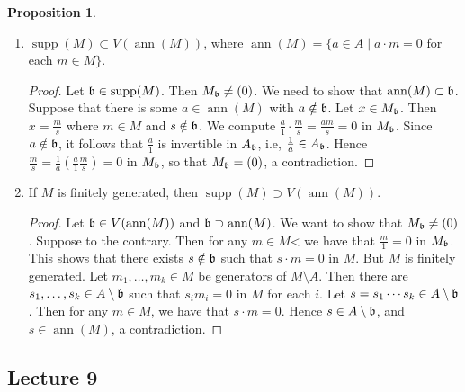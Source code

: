 \documentclass[10pt,letterpaper,cm]{nupset}
\theoremstyle{definition}
\theoremstyle{theorem}
\newtheorem{prop}[definition]{Proposition}
\theoremstyle{remark}
\newcommand{\1}{\mathbf{1}}
\newcommand{\0}{\vec 0}
\DeclareMathOperator{\ann}{ann}
\DeclareMathOperator{\supp}{supp}
\begin{document}
\begin{prop} $ $
\begin{enumerate}
\item $\supp(M) \subset V(\ann(M))$, where $\ann(M) = \{a\in A \mid a\cdot m = 0$ for each $m\in M\}$. 
\begin{proof}
Let $\frak{b} \in \supp(M)$. Then $M_{\frak{b}} \ne (0)$. We need to show that $\ann(M) \subset \frak{b}$.  Suppose that there is some $a\in \ann(M)$ with $a\notin \frak{b}$. Let $x\in M_{\frak{b}}$. Then $x= \frac{m}{s}$ where $m\in M$ and $s\notin \frak{b}$. We compute $\frac{a}{1} \cdot \frac{m}{s} = \frac{am}{s} = 0$ in $M_{\frak{b}}$. Since $a\notin \frak{b}$, it follows that $\frac{a}{1}$ is invertible in $A_{\frak{b}}$, i.e, $\frac{1}{a} \in A_{\frak{b}}$. Hence $\frac{m}{s} = \frac{1}{a}\left(\frac{a}{1}\frac{m}{s}\right) = 0$ in $M_{\frak{b}}$, so that $M_{\frak{b}} = (0)$, a contradiction.  
\end{proof}
\item If $M$ is finitely generated, then  $\supp(M) \supset V(\ann(M))$.
\begin{proof}
Let $\frak{b} \in V(\ann(M))$ and $\frak{b} \supset \ann(M)$. We want to show that $M_{\frak{b}} \ne (0)$. Suppose to the contrary. Then for any $m\in M$< we have that $\frac{m}{1} =0$ in $M_{\frak{b}}$. This shows that there exists $s\notin \frak{b}$ such that $s\cdot m = 0$ in $M$. But $M$ is finitely generated. Let $m_1, \ldots, m_k \in M$ be generators of $M \setminus A$. Then there are $s_1, \ldots, s_k \in A \setminus \frak{b}$ such that $s_im_i =0$ in $M$ for each $i$. Let $s = s_1 \cdots s_k \in A\setminus \frak{b}$. Then for any $m\in M$, we have that $s\cdot m = 0$. Hence $s\in A \setminus \frak{b}$, and $s\in \ann(M)$, a contradiction. 
\end{proof}
\end{enumerate}
\end{prop}

\subsection{Lecture 9}
\end{document}
